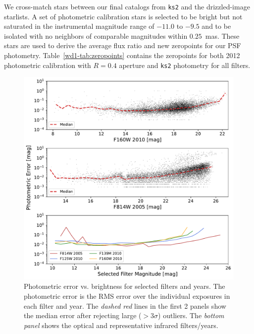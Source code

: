 \documentclass[12pt]{ucsddissertation}
\begin{document}
\begin{CJK*}{UTF8}{gbsn}
We cross-match stars between our final catalogs from \texttt{ks2} and the drizzled-image starlists. 
A set of photometric calibration stars is selected to be bright but not saturated in the instrumental magnitude range of $-11.0$ to $-9.5$ and to be isolated with no neighbors of comparable magnitudes within $0.25$~mas. These stars are used to derive the average flux ratio and new zeropoints for our PSF photometry.  Table~\ref{wd1-tab:zeropoints} contains the zeropoints for both 2012 photometric calibration with $R=0.4$ aperture and \texttt{ks2} photometry for all filters.

\begin{figure}[htb!]
\centering
\includegraphics[width=\linewidth]{figures/chapter2/WD1_Photometric_Errors_no_title.pdf}
\caption[Photometric error vs. magnitude]{Photometric error vs. brightness for selected filters and years. The photometric error is the RMS error over the individual exposures in each filter and year. The {\em dashed red} lines in the first 2 panels show the median error after rejecting large ($>3\sigma$) outliers. The {\em bottom panel} shows the optical and representative infrared filters/years.}
\label{fig:photometric_error}
\end{figure}



\end{CJK*}
\end{document}
